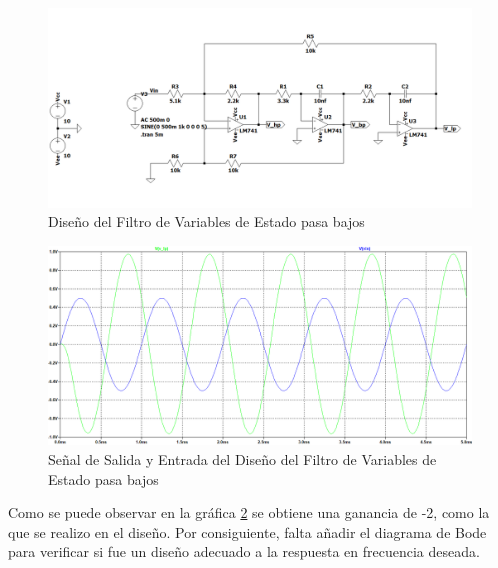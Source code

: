 \begin{enumerate}
\begin{itemize}
                \begin{figure}[H]
                      \centering
                      \includegraphics[width=15cm]{Imagenes/sim_var_estado_circuito.png}
                      \caption{Diseño del Filtro de Variables de Estado pasa bajos}
                      \label{fig:sim_var_estado_circuito}
                \end{figure}

                \begin{figure}[H]
                      \centering
                      \renewcommand{\figurename}{Gráfica}
                      \setcounter{figure}{8}
                      \includegraphics[width=15cm]{Imagenes/sim_var_estado_vo.png}
                      \caption{Señal de Salida y Entrada del Diseño del Filtro de Variables de Estado pasa bajos}
                      \label{fig:sim_var_estado_vo}
                \end{figure}

                Como se puede observar en la gráfica \ref{fig:sim_var_estado_vo} se obtiene una ganancia de -2, como la que se realizo en el diseño. Por consiguiente, falta añadir el diagrama de Bode para verificar si fue un  diseño adecuado a la respuesta en frecuencia deseada.


\end{itemize}
\end{enumerate}
